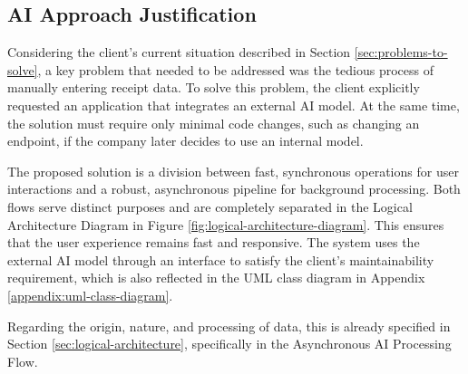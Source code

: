 \subsection{AI Approach Justification}

Considering the client's current situation described in Section \ref{sec:problems-to-solve}, a key problem that needed to be addressed was the tedious process of manually entering receipt data. To solve this problem, the client explicitly requested an application that integrates an external AI model. At the same time, the solution must require only minimal code changes, such as changing an endpoint, if the company later decides to use an internal model.

The proposed solution is a division between fast, synchronous operations for user interactions and a robust, asynchronous pipeline for background processing. Both flows serve distinct purposes and are completely separated in the Logical Architecture Diagram in Figure \ref{fig:logical-architecture-diagram}. This ensures that the user experience remains fast and responsive. The system uses the external AI model through an interface to satisfy the client's maintainability requirement, which is also reflected in the UML class diagram in Appendix \ref{appendix:uml-class-diagram}. 

Regarding the origin, nature, and processing of data, this is already specified in Section \ref{sec:logical-architecture}, specifically in the Asynchronous AI Processing Flow.
